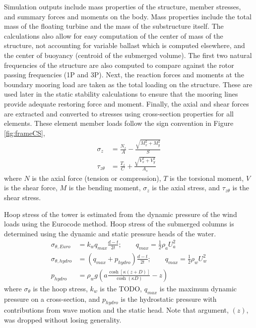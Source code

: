 Simulation outputs include mass properties of the structure, member
stresses, and summary forces and moments on the body.  Mass properties
include the total mass of the floating turbine and the mass of the
substructure itself.  The calculations also allow for easy computation
of the center of mass of the structure, not accounting for variable
ballast which is computed elsewhere, and the center of buoyancy
(centroid of the submerged volume).  The first two natural frequencies
of the structure are also computed to compare against the rotor passing
frequencies (1P and 3P).  Next, the reaction forces and moments at the
boundary mooring load are taken as the total loading on the structure.
These are used later in the static stability calculations to ensure that
the mooring lines provide adequate restoring force and moment.  Finally,
the axial and shear forces are extracted and converted
to stresses using cross-section properties for all elements.  These
element member loads follow the sign convention in Figure
\ref{fig:frameCS},
\begin{align*}
  \sigma_z &= \frac{N_z}{A} - \frac{\sqrt{M_x^2 + M_y^2}}{S}\\
  \tau_{z\theta} &= \frac{T_z}{C} + \frac{\sqrt{V_x^2 + V_y^2}}{A_s}
\end{align*}
where $N$ is the axial force (tension or compression), $T$ is the
torsional moment, $V$ is the shear force, $M$ is the bending moment,
$\sigma_z$ is the axial stress, and $\tau_{z\theta}$ is the shear
stress.  

Hoop
stress of the tower is estimated from the dynamic pressure of the
wind loads using the Eurocode method.  Hoop stress of the submerged
columns is determined using the dynamic and static pressure heads of the
water.
\begin{align*}
  \sigma_{\theta,Euro} &= k_w q_{max} \frac{d-t}{2t};\qquad q_{max} =
                         \frac{1}{2}\rho_a U_a^2\\
  \sigma_{\theta,hydro} &= \left(q_{max}+p_{hydro}\right) \frac{d-t}{2t};\qquad q_{max} =
                          \frac{1}{2}\rho_w U_w^2\\
  p_{hydro} &= \rho_w g \left( a\frac{\cosh\left[\kappa\left(z + D \right)\right]}{\cosh\left(\kappa D\right)} - z\right)
\end{align*}
where $\sigma_{\theta}$ is the hoop stress, $k_w$ is the TODO, $q_{max}$
is the maximum dynamic pressure on a cross-section, and $p_{hydro}$ is
the hydrostatic pressure with contributions from wave motion and the
static head.  Note that argument, $(z)$, was dropped without losing generality.

